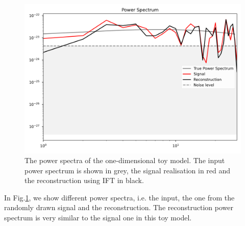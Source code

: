 \begin{figure}[h]
    \centering
    \includegraphics[width=0.8\linewidth]{Images/power_spectrum_400Hz_1D.png}
    \caption{The power spectra of the one-dimensional toy model. The input power spectrum is shown in grey, the signal realisation in red and the reconstruction using IFT in black.}
    \label{1D_power_spectrum}
\end{figure} 

In Fig.\ref{1D_power_spectrum}, we show different power spectra, i.e. the input, the one from the randomly drawn signal and the reconstruction. The reconstruction power spectrum is very similar to the signal one in this toy model.

